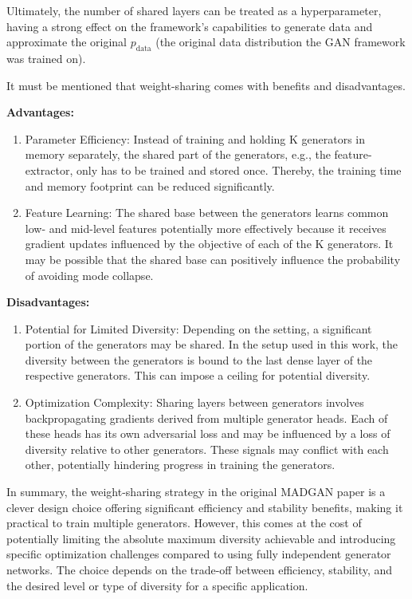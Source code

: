 Ultimately, the number of shared layers can be treated as a hyperparameter, having a strong effect on the framework's capabilities to generate data and approximate the original \(p_{\text{data}}\) (the original data distribution the GAN framework was trained on).

It must be mentioned that weight-sharing comes with benefits and disadvantages.

\noindent\textbf{Advantages:}
\begin{enumerate}
\item Parameter Efficiency: Instead of training and holding K generators in memory separately, the shared part of the generators, e.g., the feature-extractor, only has to be trained and stored once. Thereby, the training time and memory footprint can be reduced significantly.
\item Feature Learning: The shared base between the generators learns common low- and mid-level features potentially more effectively because it receives gradient updates influenced by the objective of each of the K generators. It may be possible that the shared base can positively influence the probability of avoiding mode collapse.
\end{enumerate}

\noindent\textbf{Disadvantages:}
\begin{enumerate}
\item Potential for Limited Diversity: Depending on the setting, a significant portion of the generators may be shared. In the setup used in this work, the diversity between the generators is bound to the last dense layer of the respective generators. This can impose a ceiling for potential diversity.
\item Optimization Complexity: Sharing layers between generators involves backpropagating gradients derived from multiple generator heads. Each of these heads has its own adversarial loss and may be influenced by a loss of diversity relative to other generators. These signals may conflict with each other, potentially hindering progress in training the generators.
\end{enumerate}

In summary, the weight-sharing strategy in the original MADGAN paper is a clever design choice offering significant efficiency and stability benefits, making it practical to train multiple generators. However, this comes at the cost of potentially limiting the absolute maximum diversity achievable and introducing specific optimization challenges compared to using fully independent generator networks. The choice depends on the trade-off between efficiency, stability, and the desired level or type of diversity for a specific application.

\newpage
